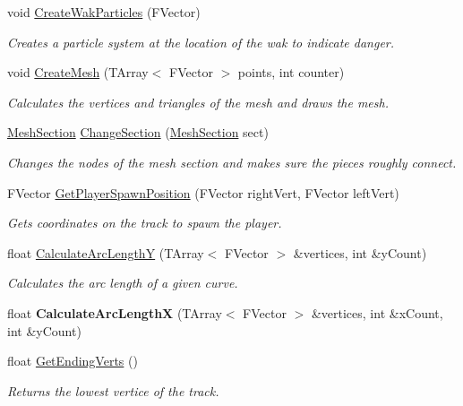 \begin{DoxyCompactItemize}
void \mbox{\hyperlink{class_a_track_generator_bezier_a5997b6d3fc32dd5e2ebb18b548de593b}{Create\+Wak\+Particles}} (F\+Vector)
\begin{DoxyCompactList}\small\item\em Creates a particle system at the location of the wak to indicate danger. \end{DoxyCompactList}\item 
void \mbox{\hyperlink{class_a_track_generator_bezier_add24d98642fb9bf3565bfc1f9ca59b97}{Create\+Mesh}} (T\+Array$<$ F\+Vector $>$ points, int counter)
\begin{DoxyCompactList}\small\item\em Calculates the vertices and triangles of the mesh and draws the mesh. \end{DoxyCompactList}\item 
\mbox{\hyperlink{class_mesh_section}{Mesh\+Section}} \mbox{\hyperlink{class_a_track_generator_bezier_a7e0d9a91c85f202a673a2d6ec995613b}{Change\+Section}} (\mbox{\hyperlink{class_mesh_section}{Mesh\+Section}} sect)
\begin{DoxyCompactList}\small\item\em Changes the nodes of the mesh section and makes sure the pieces roughly connect. \end{DoxyCompactList}\item 
F\+Vector \mbox{\hyperlink{class_a_track_generator_bezier_a383bbfd04a3daeb4afbeb54d76504890}{Get\+Player\+Spawn\+Position}} (F\+Vector right\+Vert, F\+Vector left\+Vert)
\begin{DoxyCompactList}\small\item\em Gets coordinates on the track to spawn the player. \end{DoxyCompactList}\item 
float \mbox{\hyperlink{class_a_track_generator_bezier_a8f525f68b49a3f4feffdb2982af838ea}{Calculate\+Arc\+LengthY}} (T\+Array$<$ F\+Vector $>$ \&vertices, int \&y\+Count)
\begin{DoxyCompactList}\small\item\em Calculates the arc length of a given curve. \end{DoxyCompactList}\item 
\mbox{\label{class_a_track_generator_bezier_afc717555960f90812874306371f2f316}} 
float {\bfseries Calculate\+Arc\+LengthX} (T\+Array$<$ F\+Vector $>$ \&vertices, int \&x\+Count, int \&y\+Count)
\item 
float \mbox{\hyperlink{class_a_track_generator_bezier_ab3623ddd81be538a80c1c6356c0a1740}{Get\+Ending\+Verts}} ()
\begin{DoxyCompactList}\small\item\em Returns the lowest vertice of the track. \end{DoxyCompactList}\end{DoxyCompactItemize}
